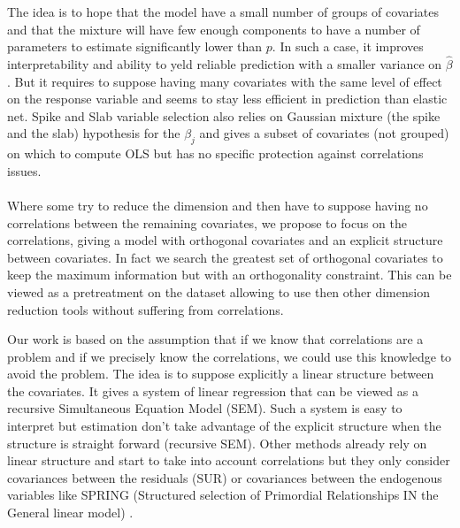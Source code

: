 \documentclass[11pt,a4paper]{article}
\begin{document}
The idea is to hope that the model have a small number of groups of covariates and that the mixture will have few enough components to have a number of parameters to estimate significantly lower than $p$. In such a case, it improves interpretability and ability to yeld reliable prediction with a smaller variance on $\hat{\beta}$. But it requires to suppose having many covariates with the same level of effect on the response variable and seems to stay less efficient in prediction than elastic net. Spike and Slab variable selection \cite{ishwaran2005spike} also relies on Gaussian mixture (the spike and the slab) hypothesis for the $\beta_j$ and gives a subset of covariates (not grouped) on which to compute OLS but has no specific protection against correlations issues.
	~\\	~\\

 Where some try to reduce the dimension and then have to suppose having no correlations between the remaining covariates,  we propose to focus on the correlations, giving a model with orthogonal covariates and an explicit structure between covariates. In fact we search the greatest set of orthogonal covariates to keep the maximum information but with an orthogonality constraint. This can be viewed as a pretreatment on the dataset allowing to use then other dimension reduction tools without suffering from correlations. %
 
	Our work is based on the assumption that if we know that correlations are a problem and if we precisely know the correlations, we could use this knowledge to avoid the problem.
	The idea is to suppose explicitly a linear structure between the covariates. 
	It gives a system of linear regression that can be viewed as a recursive Simultaneous Equation Model (SEM)\cite{davidson1993estimation}. Such a system is easy to interpret but estimation don't take advantage of the explicit structure \cite{TIMM} when the structure is straight forward (recursive SEM).
  	Other methods already rely on linear structure and start to take into account correlations but they only consider covariances between the residuals (SUR) \cite{SURzellner} or covariances between the endogenous variables like SPRING (Structured selection of Primordial Relationships IN the General linear model) \cite{chiquetconf}.
\end{document}
